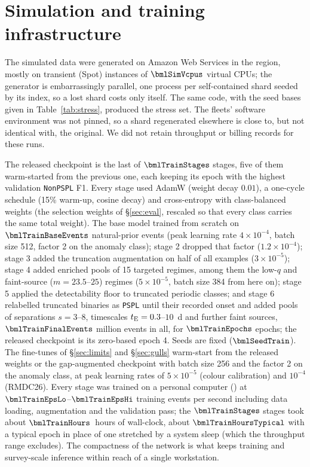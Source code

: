 \documentclass[twocolumn,linenumbers,floatfix,twocolappendix]{aastex701}
\newcommand{\code}[1]{\texttt{#1}}
\begin{document}
\fussy
\appendix

\section{Simulation and training infrastructure}\label{app:infra}
\sloppy     %

The simulated data were generated on Amazon Web Services in the \texttt{\bmlSimRegion} region, mostly on
transient (Spot) instances of $\bmlSimVcpus$ virtual CPUs; the generator is embarrassingly parallel, one process
per self-contained shard seeded by its index, so a lost shard costs only itself. The same code, with the seed
bases given in Table~\ref{tab:stress}, produced the stress set. The fleets' software environment was not pinned, so a shard
regenerated elsewhere is close to, but not identical with, the original. We did not retain throughput or billing
records for these runs.

The released checkpoint is the last of $\bmlTrainStages$ stages, five of them warm-started from the previous one,
each keeping its epoch with the highest validation \texttt{NonPSPL} F1. Every stage used AdamW (weight decay
$0.01$), a one-cycle schedule (15\% warm-up, cosine decay) and cross-entropy with class-balanced weights (the
selection weights of \S\ref{sec:eval}, rescaled so that every class carries the same total weight). The base model
trained from scratch on $\bmlTrainBaseEvents$ natural-prior events (peak learning rate $4\times10^{-4}$, batch size
512, factor 2 on the anomaly class); stage 2 dropped that factor ($1.2\times10^{-4}$); stage 3 added the truncation
augmentation on half of all examples ($3\times10^{-5}$); stage 4 added enriched pools of 15 targeted regimes,
among them the low-$q$ and faint-source ($m = 23.5$--$25$) regimes ($5\times10^{-5}$, batch size 384 from here on);
stage 5 applied the detectability floor to truncated periodic classes; and stage 6 relabelled truncated binaries
as \texttt{PSPL} until their recorded onset and added pools of separations $s = 3$--$8$, timescales
$t_{\rm E} = 0.3$--$10$~d and further faint sources, $\bmlTrainFinalEvents$ million events in all, for
$\bmlTrainEpochs$ epochs; the released checkpoint is its zero-based epoch 4. Seeds are fixed ($\bmlSeedTrain$).
The fine-tunes of \S\ref{sec:limits} and \S\ref{sec:gulls} warm-start from the released weights or the
gap-augmented checkpoint with batch size 256 and the factor 2 on the anomaly class, at peak learning rates of
$5\times10^{-5}$ (colour calibration) and $10^{-4}$ (RMDC26). Every stage was trained on a personal computer
(\bmlTrainDevice) at $\bmlTrainEpsLo$--$\bmlTrainEpsHi$ training events per second including data loading,
augmentation and the validation pass; the $\bmlTrainStages$ stages took about $\bmlTrainHours$~hours of wall-clock,
about $\bmlTrainHoursTypical$ with a typical epoch in place of one stretched by a system sleep (which the throughput
range excludes). The compactness of the network is what keeps
training and survey-scale inference within reach of a single workstation.
\end{document}
